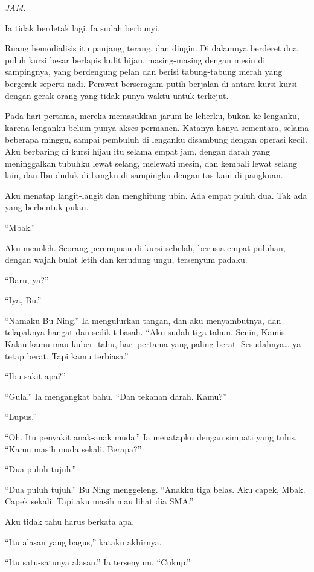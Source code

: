 \documentclass[11pt,twoside,openany]{book}
\makeatletter
\newcommand{\scenebreak}{\par\vspace{0.9em}{\centering\textsc{*\hspace{0.7em}*\hspace{0.7em}*}\par}\vspace{0.9em}\@afterindentfalse\@afterheading}
\makeatother
\begin{document}
\emph{JAM.}

Ia tidak berdetak lagi. Ia sudah berbunyi.

\scenebreak
Ruang hemodialisis itu panjang, terang, dan dingin. Di dalamnya berderet dua puluh kursi besar berlapis kulit hijau, masing-masing dengan mesin di sampingnya, yang berdengung pelan dan berisi tabung-tabung merah yang bergerak seperti nadi. Perawat berseragam putih berjalan di antara kursi-kursi dengan gerak orang yang tidak punya waktu untuk terkejut.

Pada hari pertama, mereka memasukkan jarum ke leherku, bukan ke lenganku, karena lenganku belum punya akses permanen. Katanya hanya sementara, selama beberapa minggu, sampai pembuluh di lenganku disambung dengan operasi kecil. Aku berbaring di kursi hijau itu selama empat jam, dengan darah yang meninggalkan tubuhku lewat selang, melewati mesin, dan kembali lewat selang lain, dan Ibu duduk di bangku di sampingku dengan tas kain di pangkuan.

Aku menatap langit-langit dan menghitung ubin. Ada empat puluh dua. Tak ada yang berbentuk pulau.

``Mbak.''

Aku menoleh. Seorang perempuan di kursi sebelah, berusia empat puluhan, dengan wajah bulat letih dan kerudung ungu, tersenyum padaku.

``Baru, ya?''

``Iya, Bu.''

``Namaku Bu Ning.'' Ia mengulurkan tangan, dan aku menyambutnya, dan telapaknya hangat dan sedikit basah. ``Aku sudah tiga tahun. Senin, Kamis. Kalau kamu mau kuberi tahu, hari pertama yang paling berat. Sesudahnya\ldots{} ya tetap berat. Tapi kamu terbiasa.''

``Ibu sakit apa?''

``Gula.'' Ia mengangkat bahu. ``Dan tekanan darah. Kamu?''

``Lupus.''

``Oh. Itu penyakit anak-anak muda.'' Ia menatapku dengan simpati yang tulus. ``Kamu masih muda sekali. Berapa?''

``Dua puluh tujuh.''

``Dua puluh tujuh.'' Bu Ning menggeleng. ``Anakku tiga belas. Aku capek, Mbak. Capek sekali. Tapi aku masih mau lihat dia SMA.''

Aku tidak tahu harus berkata apa.

``Itu alasan yang bagus,'' kataku akhirnya.

``Itu satu-satunya alasan.'' Ia tersenyum. ``Cukup.''
\end{document}

